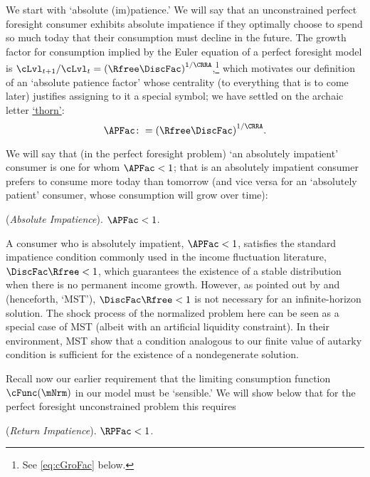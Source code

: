 \documentclass[BufferStockTheory]{subfiles}
\begin{document}
We start with `absolute (im)patience.' We will say that an unconstrained perfect foresight consumer exhibits absolute impatience if they optimally choose to spend so much today that their consumption must decline in the future. The growth factor for consumption implied by the Euler equation of a perfect foresight model is $\cLvl_{t+1}/\cLvl_{t} = {(\Rfree\DiscFac)}^{1/\CRRA}$,\footnote{See \eqref{eq:cGroFac} below.} which motivates our definition of an `absolute patience factor' whose centrality (to everything that is to come later) justifies assigning to it a special symbol; we have settled on the archaic letter \href{https://en.wikipedia.org/wiki/Thorn_(letter)}{`thorn'}:
\hypertarget{APFacDefn}{}
\begin{equation}\label{eq:APFac}
    \APFac \colon= {(\Rfree\DiscFac)}^{1/\CRRA}.
\end{equation}

We will say that (in the perfect foresight problem) `an absolutely impatient' consumer is one for whom $\APFac < 1$; that is an absolutely impatient consumer prefers to consume more today than tomorrow (and vice versa for an `absolutely patient' consumer, whose consumption will grow over time):
\hypertarget{AIC}{}
\begin{assumL} (\textit{Absolute Impatience}). \label{ass:AIC}
$\APFac  < 1$. 
\end{assumL}

\begin{remark}
  A consumer who is absolutely impatient, $\APFac<1$, satisfies the standard impatience condition commonly used in the income fluctuation literature, $\DiscFac\Rfree<1$, which guarantees the existence of a stable distribution when there is no permanent income growth. However, as pointed out by \cite{szeidlInvariant} and \cite{maUnboundedDP} (henceforth, `MST'), $\DiscFac\Rfree<1$ is not necessary for an infinite-horizon solution. The shock process of the normalized problem here can be seen as a special case of MST (albeit with an artificial liquidity constraint). In their environment, MST show that a condition analogous to our finite value of autarky condition is sufficient for the existence of a nondegenerate solution.\reversemarginpar{}
\end{remark}


Recall now our earlier requirement that the limiting consumption function $\cFunc(\mNrm)$ in our model must be `sensible.'  We will show below that for the perfect foresight unconstrained problem this requires
\hypertarget{RIC}{}
\begin{assumL} (\textit{Return Impatience}).\label{ass:RIC}
$\RPFac  < 1$. 
\end{assumL}
\end{document}
